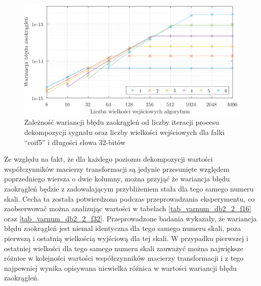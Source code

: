\begin{figure}[htb!]
\begin{center}
\includegraphics{obrazki/dwt_rerror_coif5}
\caption{Zależność wariancji błędu zaokrągleń od liczby iteracji procesu dekompozycji sygnału oraz liczby wielkości wejściowych dla falki \enquote{coif5} i długości słowa 32-bitów \label{fig_dwt_rerror_coif5}}
\end{center}
\end{figure}

Ze względu na fakt, że dla każdego poziomu dekompozycji wartości współczynników macierzy transformacji są jedynie przesunięte względem poprzedniego wiersza o dwie kolumny, można przyjąć że wariancja błędu zaokrągleń będzie z zadowalającym przybliżeniem stała dla tego samego numeru skali. Cecha ta została potwierdzona podczas przeprowadzania eksperymentu, co zaobserwować można analizując wartości w tabelach \ref{tab_varnum_db2_2_f16} oraz \ref{tab_varnum_db2_2_f32}. Przeprowadzone badania wykazały, że wariancja błędu zaokrągleń jest niemal identyczna dla tego samego numeru skali, poza pierwszą i ostatnią wielkością wyjściową dla tej skali. W przypadku pierwszej i ostatniej wielkości dla tego samego numeru skali zauważyć można największe różnice w kolejności wartości współczynników macierzy transformacji i z tego najpewniej wynika opisywana niewielka różnica w wartości wariancji błędu zaokrągleń.

